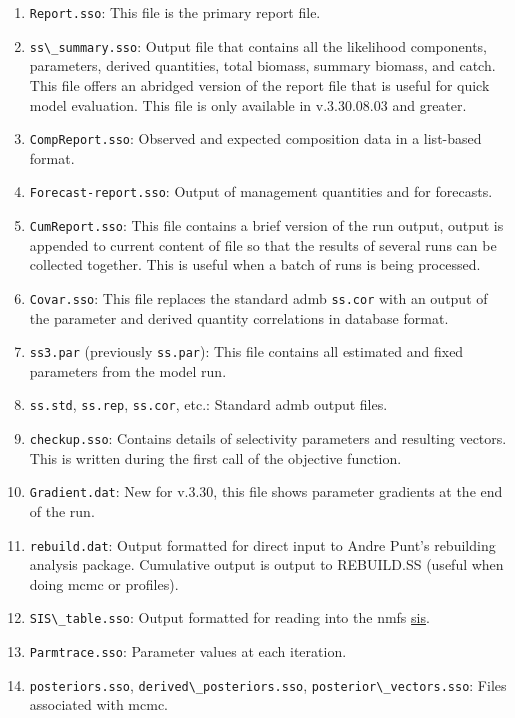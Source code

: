 \begin{enumerate}
	\item \verb|Report.sso|: This file is the primary report file.
	\item \verb|ss\_summary.sso|: Output file that contains all the likelihood components, parameters, derived quantities, total biomass, summary biomass, and catch. This file offers an abridged version of the report file that is useful for quick model evaluation. This file is only available in v.3.30.08.03 and greater.
	\item \verb|CompReport.sso|: Observed and expected composition data in a list-based format.
	\item \verb|Forecast-report.sso|: Output of management quantities and for forecasts.
	\item \verb|CumReport.sso|: This file contains a brief version of the run output, output is appended to current content of file so that the results of several runs can be collected together. This is useful when a batch of runs is being processed.
	\item \verb|Covar.sso|: This file replaces the standard \gls{admb} \verb|ss.cor| with an output of the parameter and derived quantity correlations in database format.
	\item \verb|ss3.par| (previously \verb|ss.par|): This file contains all estimated and fixed parameters from the model run. 
	\item \verb|ss.std|, \verb|ss.rep|, \verb|ss.cor|, etc.: Standard \gls{admb} output files.
	\item \verb|checkup.sso|: Contains details of selectivity parameters and resulting vectors. This is written during the first call of the objective function.
	\item \verb|Gradient.dat|: New for v.3.30, this file shows parameter gradients at the end of the run.
	\item \verb|rebuild.dat|: Output formatted for direct input to Andre Punt's rebuilding analysis package. Cumulative output is output to REBUILD.SS (useful when doing \gls{mcmc} or profiles).
	\item \verb|SIS\_table.sso|: Output formatted for reading into the \gls{nmfs} \href{https://www.st.nmfs.noaa.gov/sis/}{\gls{sis}}.
	\item \verb|Parmtrace.sso|: Parameter values at each iteration.
	\item \verb|posteriors.sso|, \verb|derived\_posteriors.sso|, \verb|posterior\_vectors.sso|: Files associated with \gls{mcmc}.
\end{enumerate}

